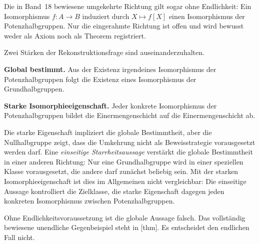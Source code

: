 \documentclass[main.tex]{subfiles}
\begin{document}
\begin{samepage}
\begin{center}
\end{center}
\end{samepage}

Die in Band~18 bewiesene umgekehrte Richtung gilt sogar ohne Endlichkeit:
Ein Isomorphismus \(f\colon A\to B\) induziert durch \(X\mapsto f[X]\) einen
Isomorphismus der Potenzhalbgruppen.  Nur die eingerahmte Richtung ist offen
und wird bewusst weder als Axiom noch als Theorem registriert.

Zwei Stärken der Rekonstruktionsfrage sind auseinanderzuhalten.

\smallskip
\noindent\textbf{Global bestimmt.}
Aus der Existenz irgendeines Isomorphismus der Potenzhalbgruppen folgt die
Existenz eines Isomorphismus der Grundhalbgruppen.

\smallskip
\noindent\textbf{Starke Isomorphieeigenschaft.}
Jeder konkrete Isomorphismus der Potenzhalbgruppen bildet die
Einermengenschicht auf die Einermengenschicht ab.

\smallskip
Die starke Eigenschaft impliziert die globale Bestimmtheit, aber die
Nullhalbgruppe zeigt, dass die Umkehrung nicht als Beweisstrategie vorausgesetzt
werden darf.  Eine \emph{einseitige Starrheitsaussage} verstärkt die globale
Bestimmtheit in einer anderen Richtung: Nur eine Grundhalbgruppe wird in
einer speziellen Klasse vorausgesetzt, die andere darf zunächst beliebig
sein.  Mit der starken Isomorphieeigenschaft ist dies im Allgemeinen nicht
vergleichbar: Die einseitige Aussage kontrolliert die Zielklasse, die starke
Eigenschaft dagegen jeden konkreten Isomorphismus zwischen
Potenzhalbgruppen.

Ohne Endlichkeitsvoraussetzung ist die globale Aussage falsch.  Das
vollständig bewiesene unendliche Gegenbeispiel steht in
[thm].  Es entscheidet den
endlichen Fall nicht.
\end{document}
